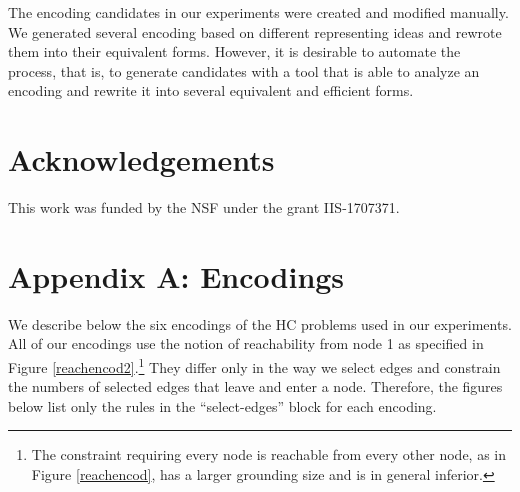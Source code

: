 \documentclass{new_tlp}
\begin{document}
The encoding candidates in our experiments were created and modified manually. 
We generated several encoding based on different representing ideas and rewrote 
them into their equivalent forms. However, it is desirable to automate the 
process, that is, to generate candidates with a tool that is able to analyze 
an encoding and rewrite it into several equivalent and efficient forms. 

\section*{Acknowledgements}
This work was funded by the NSF under the grant IIS-1707371.



\newpage
\section*{Appendix A: Encodings}
We describe below the six encodings of the HC problems used in our 
experiments. All of our encodings use the notion of reachability from
node 1 as specified in Figure \ref{reachencod2}.\footnote{The constraint 
requiring every node is reachable from every other node, as in Figure 
\ref{reachencod}, has a larger grounding size and is in general inferior.}
They differ only in the way we select edges and constrain the numbers of
selected edges that leave and enter a node. Therefore, the figures below 
list only the rules in the ``select-edges'' block for each encoding. 
\end{document}
